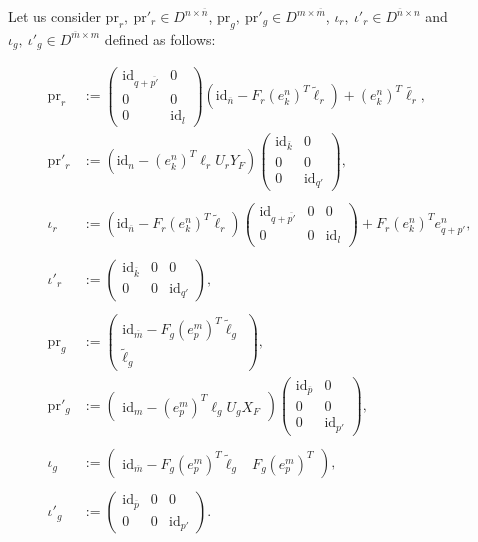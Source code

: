 \documentclass{ifacconf}
\newcommand\id[1]{\text{id}_{#1}}
\newcommand\p{\text{pr}}
\begin{document}
Let us consider $\p_r,\ \p'_r\in D^{n\times\overline{n}}$,
$\p_g,\ \p'_g\in D^{m\times\overline{m}}$, $\iota_r,\ \iota'_r\in D^{
  \overline{n}\times n}$ and $\iota_g,\ \iota'_g\in D^{\overline{m}\times
  m}$ defined as follows:
\begin{small}
  \[\begin{split}
  \p_r&:=\begin{pmatrix}
  \id{q+\overline{p'}} & 0\\
  0 & 0\\
  0 & \id{l}
  \end{pmatrix}\left(\id{\overline{n}}-F_r\left(e^n_{k}\right)^T
  \tilde{\ell}_r\right)+(e^n_{k})^T\tilde{\ell_r},\\
  \p'_r&:=\left(\id{n}-(e^{n}_{k})^T\ell_rU_rY_F\right)\begin{pmatrix}
    \id{\overline{k}} & 0\\
    0 & 0\\
    0 & \id{q'}
  \end{pmatrix}, \\
  & \\
  \iota_r&:=\left(\id{\overline{n}}-F_r\left(e^n_{k}\right)^T\tilde{
    \ell}_r\right)
  \begin{pmatrix}
    \id{q+\overline{p'}} & 0 & 0\\
    0 & 0 & \id{l}
  \end{pmatrix}+F_r\left(e^n_{k}\right)^Te^n_{q+p'},\\
  & \\
  \iota'_r&:=\begin{pmatrix}
  \id{\overline{k}} & 0 & 0\\
  0 & 0 & \id{q'}
  \end{pmatrix},\\
  & \\
  \p_g&:=\begin{pmatrix}
  \id{\overline{m}}-F_g(e^m_p)^T\tilde{\ell}_g\\
  \tilde{\ell}_g
  \end{pmatrix},\\
  \p'_g&:=\begin{pmatrix}
  \id{m}-(e^m_p)^T\ell_gU_gX_F
  \end{pmatrix}\begin{pmatrix}
    \id{\overline{p}} & 0\\
    0 & 0\\
    0 & \id{p'}
  \end{pmatrix},\\
  & \\
  \iota_g&:=\begin{pmatrix}
  \id{\overline{m}}-F_g(e^m_{p})^T\tilde{\ell}_g & F_g(e^m_{p})^T
  \end{pmatrix},\\
  & \\
  \iota'_g&:=\begin{pmatrix}
  \id{\overline{p}} & 0 & 0\\
  0 & 0 & \id{p'}
  \end{pmatrix}.
  \end{split}\]
\end{small}
\end{document}
